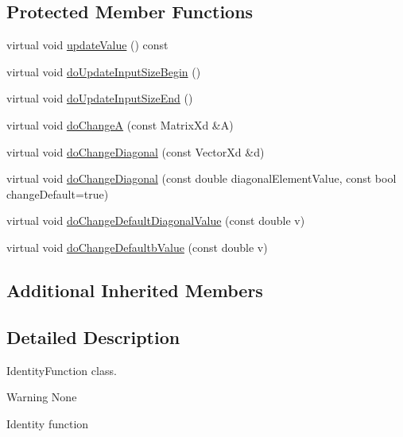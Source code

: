 \subsection*{Protected Member Functions}
\begin{DoxyCompactItemize}
\item 
virtual void \hyperlink{classocra_1_1IdentityFunction_afd77529674b7b6db3db2542aaeedbb16}{update\+Value} () const
\item 
virtual void \hyperlink{classocra_1_1IdentityFunction_aa8d5ff0e25422b3b5a4a2a8621120790}{do\+Update\+Input\+Size\+Begin} ()
\item 
virtual void \hyperlink{classocra_1_1IdentityFunction_adcfa8a32491113a590e7066f0062fbc6}{do\+Update\+Input\+Size\+End} ()
\item 
virtual void \hyperlink{classocra_1_1IdentityFunction_aa1a9f42b9b1b62182d99ea32dae6e815}{do\+ChangeA} (const Matrix\+Xd \&A)
\end{DoxyCompactItemize}
{\bf }\par
\begin{DoxyCompactItemize}
\item 
virtual void \hyperlink{classocra_1_1IdentityFunction_aea94175430c2c785dbb9d551922be9ad}{do\+Change\+Diagonal} (const Vector\+Xd \&d)
\item 
virtual void \hyperlink{classocra_1_1IdentityFunction_ac6350bcc2107b56e96642cacbbee2404}{do\+Change\+Diagonal} (const double diagonal\+Element\+Value, const bool change\+Default=true)
\item 
virtual void \hyperlink{classocra_1_1IdentityFunction_ad54cf6c0b28f6d4955f15ebd53c6ca1f}{do\+Change\+Default\+Diagonal\+Value} (const double v)
\item 
virtual void \hyperlink{classocra_1_1IdentityFunction_a989f91f6ec4e2e00aa5ac3cc8b6a2b66}{do\+Change\+Defaultb\+Value} (const double v)
\end{DoxyCompactItemize}

\subsection*{Additional Inherited Members}


\subsection{Detailed Description}
Identity\+Function class. 

\begin{DoxyWarning}{Warning}
None
\end{DoxyWarning}
Identity function 

